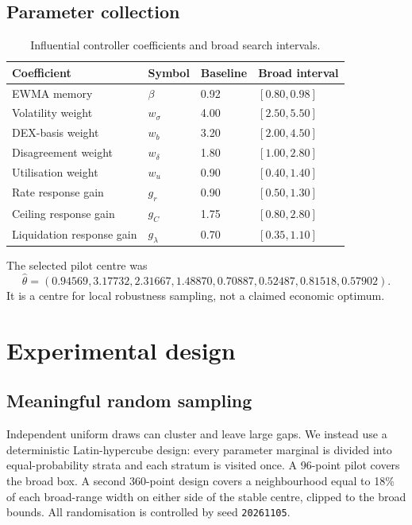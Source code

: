\documentclass[11pt,a4paper]{article}
\newcommand{\code}[1]{\texttt{#1}}
\begin{document}
\subsection{Parameter collection}

\begin{table}[H]
\centering
\caption{Influential controller coefficients and broad search intervals.}
\label{tab:parameters}
\begin{tabular}{llll}
\toprule
Coefficient & Symbol & Baseline & Broad interval\\
\midrule
EWMA memory & $\beta$ & 0.92 & $[0.80,0.98]$\\
Volatility weight & $w_\sigma$ & 4.00 & $[2.50,5.50]$\\
DEX-basis weight & $w_b$ & 3.20 & $[2.00,4.50]$\\
Disagreement weight & $w_\delta$ & 1.80 & $[1.00,2.80]$\\
Utilisation weight & $w_u$ & 0.90 & $[0.40,1.40]$\\
Rate response gain & $g_r$ & 0.90 & $[0.50,1.30]$\\
Ceiling response gain & $g_C$ & 1.75 & $[0.80,2.80]$\\
Liquidation response gain & $g_\lambda$ & 0.70 & $[0.35,1.10]$\\
\bottomrule
\end{tabular}
\end{table}

The selected pilot centre was
\begin{equation}
\hat\theta=(0.94569,3.17732,2.31667,1.48870,
0.70887,0.52487,0.81518,0.57902).
\end{equation}
It is a centre for local robustness sampling, not a claimed economic optimum.

\section{Experimental design}

\subsection{Meaningful random sampling}

Independent uniform draws can cluster and leave large gaps. We instead use a
deterministic Latin-hypercube design: every parameter marginal is divided into
equal-probability strata and each stratum is visited once. A 96-point pilot
covers the broad box. A second 360-point design covers a neighbourhood equal to
18\% of each broad-range width on either side of the stable centre, clipped to
the broad bounds. All randomisation is controlled by seed \code{20261105}.
\end{document}

